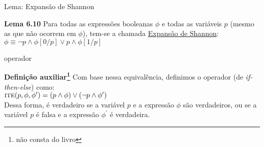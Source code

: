 \expandafter\documentclass\expandafter[table, usenames, svgnames, dvipsnames,14pt, \classopts]{beamer}
\begin{document}
\begin{frame}{Lema: Expansão de Shannon}

    \begin{block}{\textbf{Lema 6.10}}
        Para todas as expressões booleanas $\phi$ e todas as variáveis $p$ (mesmo as que não ocorrem em $\phi$), tem-se a chamada \underline{Expansão de Shannon}:\\[1em]
        $\phi \equiv \lnot{p} \land \phi[0/p] \lor p \land \phi[1/p]$
    \end{block}

\end{frame}



































%
%
\iffalse
\begin{frame}{operador }

    \begin{block}{\textbf{Definição auxiliar\footnote{não consta do livro}}}
        Com base nessa equivalência, definimos o operador  (de \textit{if-then-else}) como:\\[1em]
        $\textproc{ite}(p,\phi,\phi^{\prime}) = (p \land \phi) \lor (\lnot{p} \land \phi^{\prime})$
        \\[1em]
        Dessa forma,  é verdadeiro se a variável $p$ e a expressão $\phi$ são verdadeiros, ou se a variável $p$ é falsa e a expressão $\phi^{\prime}$ é verdadeira.
    \end{block}

\end{frame}
\end{document}
